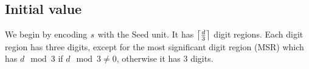 \subsection{Initial value}
%
We begin by encoding $\counterstart$ with the Seed unit.
%
It has $\ceil*{\frac{d}{3}}$ digit regions.
%
Each digit region has three digits, except for the most significant digit region (MSR) which has $d \mod 3$ if $d \mod 3 \not= 0$, otherwise it has 3 digits.
%

\begin{figure}[H]
    \centering
    \hfill%

\end{figure}
